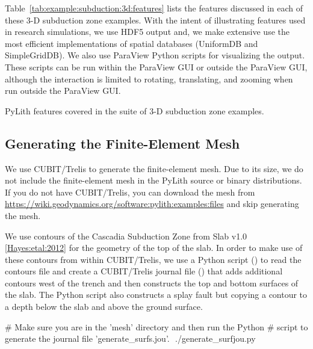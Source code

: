 Table~\ref{tab:example:subduction:3d:features} lists the features
discussed in each of these 3-D subduction zone examples. With the
intent of illustrating features used in research simulations, we use
HDF5 output and, we make extensive use the most efficient
implementations of spatial databases (UniformDB and SimpleGridDB). We
also use ParaView Python scripts for visualizing the output. These
scripts can be run within the ParaView GUI or outside the ParaView
GUI, although the interaction is limited to rotating, translating, and
zooming when run outside the ParaView GUI.

\begin{table}[htbp]
  \caption{PyLith features covered in the suite of 3-D subduction zone examples.}
  \label{tab:example:subduction:3d:features}
  
\end{table}

\subsection{Generating the Finite-Element Mesh}

We use CUBIT/Trelis to generate the finite-element mesh. Due to its
size, we do not include the finite-element mesh in the PyLith source
or binary distributions. If you do not have CUBIT/Trelis, you can
download the mesh from
\url{https://wiki.geodynamics.org/software:pylith:examples:files} and
skip generating the mesh.

We use contours of the Cascadia Subduction Zone from Slab v1.0
\ref{Hayes:etal:2012} for the geometry of the top of the slab. In
order to make use of these contours from within CUBIT/Trelis, we use a
Python script () to read the contours
file and create a CUBIT/Trelis journal file
() that adds additional contours west of
the trench and then constructs the top and bottom surfaces of the
slab. The Python script also constructs a splay fault but copying a
contour to a depth below the slab and above the ground surface.


\begin{shell}
# Make sure you are in the 'mesh' directory and then run the Python
# script to generate the journal file 'generate_surfs.jou'.
$$ ./generate_surfjou.py  
\end{shell}

